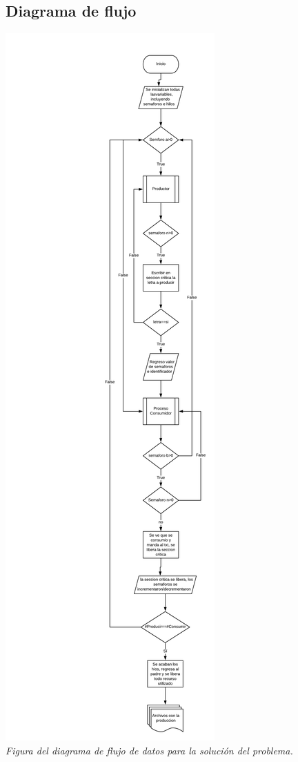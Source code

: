 \documentclass[11pt,a4paper]{article}
\begin{document}
\subsection{Diagrama de flujo}
\begin{center}
    \includegraphics[scale=0.5]{imgs/estaxd.png}
    \\
    \textit{Figura del diagrama de flujo de datos para la solución del problema.}
\end{center}
\end{document}
